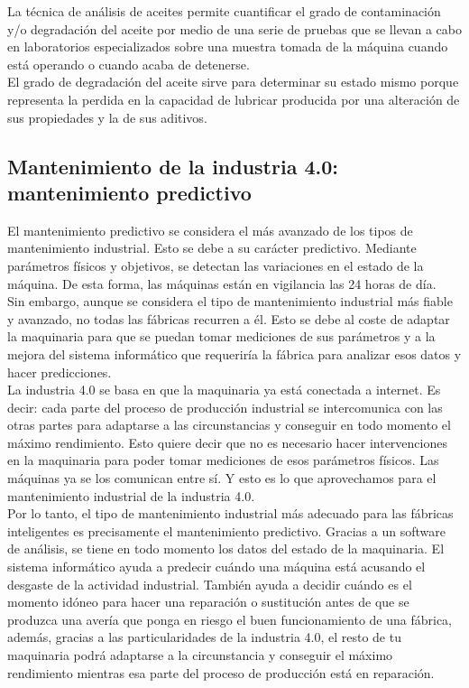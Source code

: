 \documentclass[runningheads,a4paper,12pt]{report}
\begin{document}
\begin{itemize}
La técnica de análisis de aceites permite cuantificar el grado de contaminación y/o degradación del aceite por medio de una serie de pruebas que se llevan a cabo en laboratorios especializados sobre una muestra tomada de la máquina cuando está operando o cuando acaba de detenerse. \\
 El grado de degradación del aceite sirve para determinar su estado mismo porque representa la perdida en la capacidad de lubricar producida por una alteración de sus propiedades y la de sus aditivos.  \\
	
\end{itemize}

\subsection{Mantenimiento de la industria 4.0: mantenimiento predictivo}
El mantenimiento predictivo se considera el más avanzado de los tipos de mantenimiento industrial. Esto se debe a su carácter predictivo. Mediante parámetros físicos y objetivos, se detectan las variaciones en el estado de la máquina. De esta forma, las máquinas están en vigilancia las 24 horas de día. \\

Sin embargo, aunque se considera el tipo de mantenimiento industrial más fiable y avanzado, no todas las fábricas recurren a él. Esto se debe al coste de adaptar la maquinaria para que se puedan tomar mediciones de sus parámetros y a la mejora del sistema informático que requeriría la fábrica para analizar esos datos y hacer predicciones.\\

La industria 4.0 se basa en que la maquinaria ya está conectada a internet. Es decir: cada parte del proceso de producción industrial se intercomunica con las otras partes para adaptarse a las circunstancias y conseguir en todo momento el máximo rendimiento. Esto quiere decir que no es necesario hacer intervenciones en la maquinaria para poder tomar mediciones de esos parámetros físicos. Las máquinas ya se los comunican entre sí. Y esto es lo que aprovechamos para el mantenimiento industrial de la industria 4.0. \\

Por lo tanto, el tipo de mantenimiento industrial más adecuado para las fábricas inteligentes es precisamente el mantenimiento predictivo. Gracias a un software de análisis, se tiene en todo momento los datos del estado de la maquinaria. El sistema informático ayuda a predecir cuándo una máquina está acusando el desgaste de la actividad industrial. También ayuda a decidir cuándo es el momento idóneo para hacer una reparación o sustitución antes de que se produzca una avería que ponga en riesgo el buen funcionamiento de una fábrica, además, gracias a las particularidades de la industria 4.0, el resto de tu maquinaria podrá adaptarse a la circunstancia y conseguir el máximo rendimiento mientras esa parte del proceso de producción está en reparación. \\
\newpage
\end{document}
